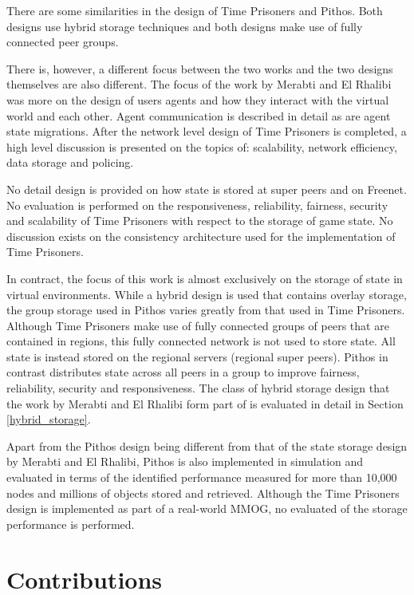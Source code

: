 There are some similarities in the design of Time Prisoners and Pithos. Both designs use hybrid storage techniques and both designs make use of fully connected peer groups.

There is, however, a different focus between the two works and the two designs themselves are also different. The focus of the work by Merabti and El Rhalibi was more on the design of users agents and how they interact with the virtual world and each other. Agent communication is described in detail as are agent state migrations. After the network level design of Time Prisoners is completed, a high level discussion is presented on the topics of: scalability, network efficiency, data storage and policing.

No detail design is provided on how state is stored at super peers and on Freenet. No evaluation is performed on the responsiveness, reliability, fairness, security and scalability of Time Prisoners with respect to the storage of game state. No discussion exists on the consistency architecture used for the implementation of Time Prisoners.

In contract, the focus of this work is almost exclusively on the storage of state in virtual environments. While a hybrid design is used that contains overlay storage, the group storage used in Pithos varies greatly from that used in Time Prisoners. Although Time Prisoners make use of fully connected groups of peers that are contained in regions, this fully connected network is not used to store state. All state is instead stored on the regional servers (regional super peers). Pithos in contrast distributes state across all peers in a group to improve fairness, reliability, security and responsiveness. The class of hybrid storage design that the work by Merabti and El Rhalibi form part of is evaluated in detail in Section \ref{hybrid_storage}.

Apart from the Pithos design being different from that of the state storage design by Merabti and El Rhalibi, Pithos is also implemented in simulation and evaluated in terms of the identified performance measured for more than 10,000 nodes and millions of objects stored and retrieved. Although the Time Prisoners design is implemented as part of a real-world MMOG, no evaluated of the storage performance is performed.

\section{Contributions}
\label{objectives}

